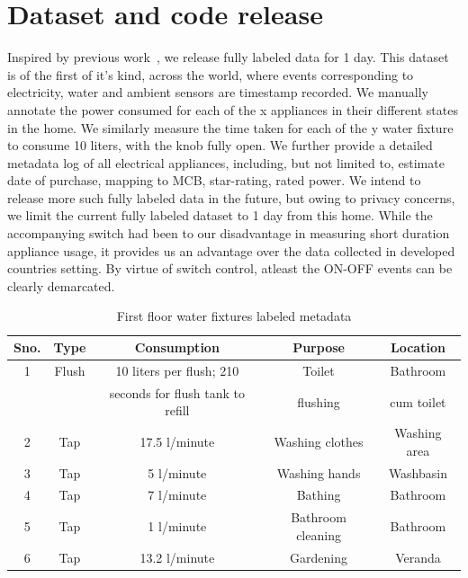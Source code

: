 \documentclass[10pt]{sensys-proc}
\begin{document}
\section{Dataset and code release}
Inspired by previous work~\cite{blued_cmu}, we release fully labeled data for 1 day. This dataset is of the first of it's kind, across the world, where events corresponding to electricity, water and ambient sensors are timestamp recorded. We manually annotate the power consumed for each of the x appliances in their different states in the home. We similarly measure the time taken for each of the y water fixture to consume 10 liters, with the knob fully open. We further provide a detailed metadata log of all electrical appliances, including, but not limited to, estimate date of purchase, mapping to MCB, star-rating, rated power. We intend to release more such fully labeled data in the future, but owing to privacy concerns, we limit the current fully labeled dataset to 1 day from this home. While the accompanying switch had been to our disadvantage in measuring short duration appliance usage, it provides us an advantage over the data collected in developed countries setting. By virtue of switch control, atleast the ON-OFF events can be clearly demarcated. 

\begin{table}
\tabcolsep=0.015cm
\vspace{-4mm}
\caption{First floor water fixtures labeled metadata}
\vspace{-4mm}
\label{tab:water_consmuption_labeled}
\footnotesize
\begin{tabular}{|c|c|c|c|c|}
\hline
\textbf{Sno.}&\textbf{Type}&\textbf{Consumption}&\textbf{Purpose}&\textbf{Location}\\
\hline
1&Flush&10 liters per flush; 210&Toilet&Bathroom\\
 &&seconds for flush tank to refill&flushing&cum toilet\\ \hline
2&Tap&17.5 l/minute&Washing clothes&Washing area\\ \hline
3&Tap&5 l/minute&Washing hands&Washbasin\\ \hline
4&Tap&7 l/minute&Bathing&Bathroom\\ \hline
5&Tap&1 l/minute&Bathroom cleaning&Bathroom\\ \hline
6&Tap&13.2 l/minute&Gardening&Veranda\\ \hline

\end{tabular}
\end{table}
\end{document}
